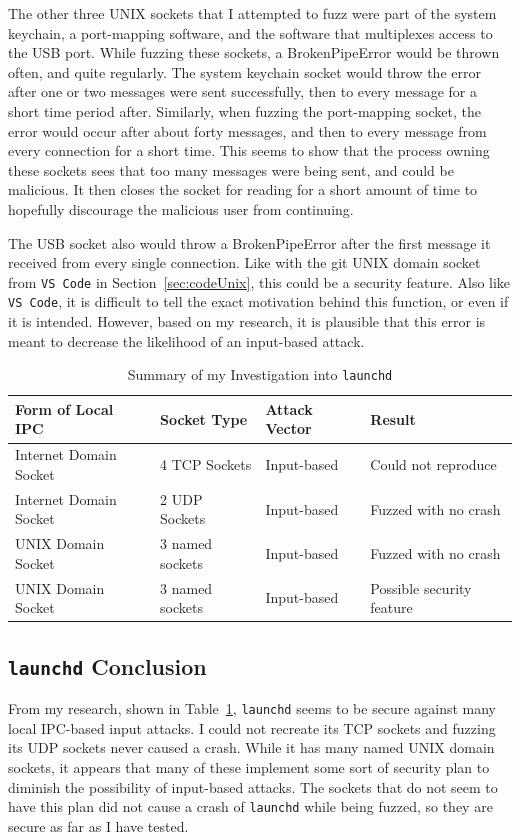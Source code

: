 The other three UNIX sockets that I attempted to fuzz were part of the system keychain, a port-mapping software, and the software that multiplexes access to the USB port.  While fuzzing these sockets, a BrokenPipeError would be thrown often, and quite regularly.  The system keychain socket would throw the error after one or two messages were sent successfully, then to every message for a short time period after.  Similarly, when fuzzing the port-mapping socket, the error would occur after about forty messages, and then to every message from every connection for a short time.  This seems to show that the process owning these sockets sees that too many messages were being sent, and could be malicious.  It then closes the socket for reading for a short amount of time to hopefully discourage the malicious user from continuing.

The USB socket also would throw a BrokenPipeError after the first message it received from every single connection.  Like with the git UNIX domain socket from \texttt{VS Code} in Section~\ref{sec:codeUnix}, this could be a security feature.  Also like \texttt{VS Code}, it is difficult to tell the exact motivation behind this function, or even if it is intended.  However, based on my research, it is plausible that this error is meant to decrease the likelihood of an input-based attack.

\begin{table}
\centering
\begin{scriptsize}
\begin{tabular}{ l | l | l | l }
\textbf{Form of Local IPC} & \textbf{Socket Type} & \textbf{Attack Vector} & \textbf{Result} \\ \hline
Internet Domain Socket & 4 TCP Sockets & Input-based & Could not reproduce \\ \hline
Internet Domain Socket & 2 UDP Sockets & Input-based & Fuzzed with no crash \\ \hline
UNIX Domain Socket & 3 named sockets & Input-based & Fuzzed with no crash \\ \hline
UNIX Domain Socket & 3 named sockets & Input-based & Possible security feature \\ \hline
\end{tabular}
\caption{Summary of my Investigation into \texttt{launchd}}
\label{tab:launchdData}
\end{scriptsize}
\end{table} 

\subsection{\texttt{launchd} Conclusion}
\label{sec:launchdConclusion}
From my research, shown in Table~\ref{tab:launchdData}, \texttt{launchd} seems to be secure against many local IPC-based input attacks.  I could not recreate its TCP sockets and fuzzing its UDP sockets never caused a crash.  While it has many named UNIX domain sockets, it appears that many of these implement some sort of security plan to diminish the possibility of input-based attacks.  The sockets that do not seem to have this plan did not cause a crash of \texttt{launchd} while being fuzzed, so they are secure as far as I have tested.

